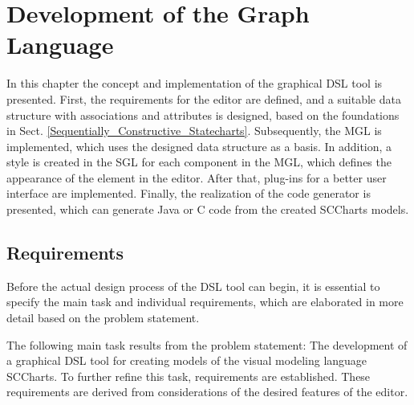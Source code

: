 \chapter{Development of the Graph Language} \label{Concept_and_Implementation_of_the_Graph_Language}
In this chapter the concept and implementation of the graphical DSL tool is presented. First, the requirements for the editor are defined, and a suitable data structure with associations and attributes is designed, based on the foundations in Sect. \ref{Sequentially_Constructive_Statecharts}. Subsequently, the MGL is implemented, which uses the designed data structure as a basis. In addition, a style is created in the SGL for each component in the MGL, which defines the appearance of the element in the editor. After that, plug-ins for a better user interface are implemented. Finally, the realization of the code generator is presented, which can generate Java or C code from the created SCCharts models.

\section{Requirements}\label{Requirements}
Before the actual design process of the DSL tool can begin, it is essential to specify the main task and individual requirements, which are elaborated in more detail based on the problem statement.

The following main task results from the problem statement: The development of a graphical DSL tool for creating models of the visual modeling language SCCharts.
To further refine this task, requirements are established. These requirements are derived from considerations of the desired features of the editor. 

